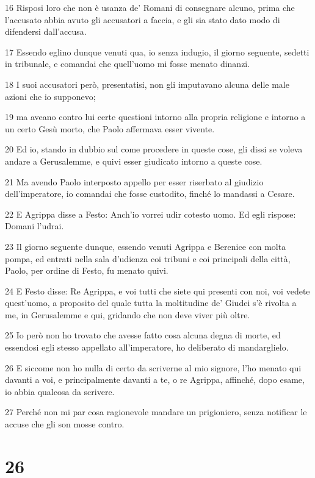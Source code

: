 \par 16 Risposi loro che non è usanza de' Romani di consegnare alcuno, prima che l'accusato abbia avuto gli accusatori a faccia, e gli sia stato dato modo di difendersi dall'accusa.
\par 17 Essendo eglino dunque venuti qua, io senza indugio, il giorno seguente, sedetti in tribunale, e comandai che quell'uomo mi fosse menato dinanzi.
\par 18 I suoi accusatori però, presentatisi, non gli imputavano alcuna delle male azioni che io supponevo;
\par 19 ma aveano contro lui certe questioni intorno alla propria religione e intorno a un certo Gesù morto, che Paolo affermava esser vivente.
\par 20 Ed io, stando in dubbio sul come procedere in queste cose, gli dissi se voleva andare a Gerusalemme, e quivi esser giudicato intorno a queste cose.
\par 21 Ma avendo Paolo interposto appello per esser riserbato al giudizio dell'imperatore, io comandai che fosse custodito, finché lo mandassi a Cesare.
\par 22 E Agrippa disse a Festo: Anch'io vorrei udir cotesto uomo. Ed egli rispose: Domani l'udrai.
\par 23 Il giorno seguente dunque, essendo venuti Agrippa e Berenice con molta pompa, ed entrati nella sala d'udienza coi tribuni e coi principali della città, Paolo, per ordine di Festo, fu menato quivi.
\par 24 E Festo disse: Re Agrippa, e voi tutti che siete qui presenti con noi, voi vedete quest'uomo, a proposito del quale tutta la moltitudine de' Giudei s'è rivolta a me, in Gerusalemme e qui, gridando che non deve viver più oltre.
\par 25 Io però non ho trovato che avesse fatto cosa alcuna degna di morte, ed essendosi egli stesso appellato all'imperatore, ho deliberato di mandarglielo.
\par 26 E siccome non ho nulla di certo da scriverne al mio signore, l'ho menato qui davanti a voi, e principalmente davanti a te, o re Agrippa, affinché, dopo esame, io abbia qualcosa da scrivere.
\par 27 Perché non mi par cosa ragionevole mandare un prigioniero, senza notificar le accuse che gli son mosse contro.

\chapter{26}


